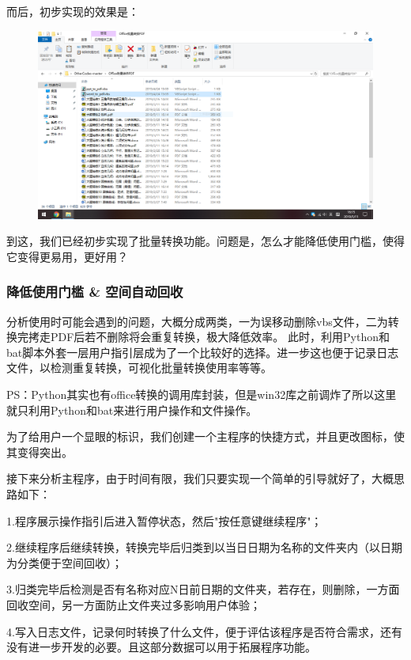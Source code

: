 \documentclass[a5paper]{article}
\begin{document}
        而后，初步实现的效果是：

        \begin{figure}[htbp]
        \centering
        \includegraphics[scale=0.3]{2.2-p4.png}
        \end{figure}

        到这，我们已经初步实现了批量转换功能。问题是，怎么才能降低使用门槛，使得它变得更易用，更好用？

        \subsubsection{降低使用门槛 \& 空间自动回收}
        分析使用时可能会遇到的问题，大概分成两类，一为误移动删除vbs文件，二为转换完拷走PDF后若不删除将会重复转换，极大降低效率。
        此时，利用Python和bat脚本外套一层用户指引层成为了一个比较好的选择。进一步这也便于记录日志文件，以检测重复转换，可视化批量转换使用率等等。

        PS：Python其实也有office转换的调用库封装，但是win32库之前调炸了所以这里就只利用Python和bat来进行用户操作和文件操作。

        为了给用户一个显眼的标识，我们创建一个主程序的快捷方式，并且更改图标，使其变得突出。

        接下来分析主程序，由于时间有限，我们只要实现一个简单的引导就好了，大概思路如下：

        1.程序展示操作指引后进入暂停状态，然后"按任意键继续程序"；
        
        2.继续程序后继续转换，转换完毕后归类到以当日日期为名称的文件夹内（以日期为分类便于空间回收）；
        
        3.归类完毕后检测是否有名称对应N日前日期的文件夹，若存在，则删除，一方面回收空间，另一方面防止文件夹过多影响用户体验；

        4.写入日志文件，记录何时转换了什么文件，便于评估该程序是否符合需求，还有没有进一步开发的必要。且这部分数据可以用于拓展程序功能。
\end{document}
